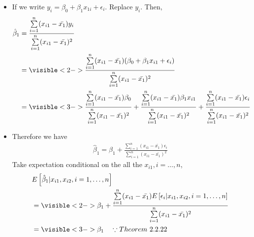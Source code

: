 \documentclass{beamer}
\newcommand{\0}{\mathbf{0}}
\begin{document}


\begin{frame}
\begin{itemize}
\item If we write $y_i=\beta_{0}+\beta_{1}x_{1i}+\epsilon_i$. Replace $y_i$. Then,
{\small
\begin{align*}
\hat{\beta}_{1}&=\frac{\sum\limits_{i=1}^{n}(x_{i1}-\bar{x_{1}})y_{i}}{\sum\limits_{i=1}^{n}(x_{i1}-\bar{x_{1}})^{2}}\\
&= \visible<2->{\frac{\sum\limits_{i=1}^{n}(x_{i1}-\bar{x_{1}})(\beta_{0}+\beta_{1}x_{i1}+\epsilon_{i})}{\sum\limits_{i=1}^{n}(x_{i1}-\bar{x_{1}})^{2}}}\\
&=\visible<3->{\frac{\sum\limits_{i=1}^{n}(x_{i1}-\bar{x_{1}})\beta_{0}}{\sum\limits_{i=1}^{n}(x_{i1}-\bar{x_{1}})^{2}}+\frac{\sum\limits_{i=1}^{n}(x_{i1}-\bar{x_{1}})\beta_{1}x_{i1}}{\sum\limits_{i=1}^{n}(x_{i1}-\bar{x_{1}})^{2}}+
\frac{\sum\limits_{i=1}^{n}(x_{i1}-\bar{x_{1}})\epsilon_{i}}{\sum\limits_{i=1}^{n}(x_{i1}-\bar{x_{1}})^{2}}}
\end{align*}}
\end{itemize}
\end{frame}

\begin{frame}
\begin{itemize}
\item Therefore we have
\begin{align*}
\hat\beta_{1}=\beta_{1}+\frac{\sum\limits_{i=1}^{n}(x_{i1}-\bar{x_{1}})\epsilon_{i}}{\sum\limits_{i=1}^{n}(x_{i1}-\bar{x_{1}})^{2}}
\end{align*}
Take expectation conditional on the all the $x_{i1},i=\dots,n$,
{\scriptsize
\begin{align*}
&E\left[\hat\beta_{1}\vert x_{i1},x_{i2},i=1,\dots,n\right]\\
&=\visible<2->{\beta_{1}+\frac{\sum\limits_{i=1}^{n}(x_{i1}-\bar{x_{1}})E\left[\epsilon_{i}\vert  x_{i1},x_{i2},i=1,\dots,n\right]}{\sum\limits_{i=1}^{n}(x_{i1}-\bar{x_{1}})^{2}}}\\
&=\visible<3->{\beta_{1}  \quad\because Theorem~ 2.2.22}
\end{align*}
}
\end{itemize}
\end{frame}
\end{document}
